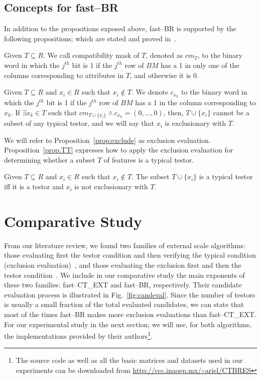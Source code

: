 \documentclass[citenumber]{llncs}
\begin{document}
%
\subsection{Concepts for fast--BR}
%
	In addition to the propositions exposed above, fast--BR is supported by the following propositions; which are stated and proved in~\cite{Lias2013}.
	
	\begin{definition}\label{def:exclusion}
		Given $T \subseteq R$. We call compatibility mask of $T$, denoted as $cm_T$, to the binary word in which the $j^{\mathit{th}}$ bit is 1 if the $j^{\mathit{th}}$ row of $BM$ has a 1 in only one of the columns corresponding to attributes in $T$, and otherwise it is 0.
	\end{definition}
	
	\begin{proposition}\label{prop:exclude} 
		Given $T \subseteq R$ and $x_i \in R$ such that $x_i \notin T$.	We denote $c_{x_k}$ to the binary word in which the $j^{\mathit{th}}$ bit is 1 if the $j^{\mathit{th}}$ row of $BM$ has a 1 in the column corresponding to $x_k$. If $\exists x_k \in T$ such that $cm_{T \cup \lbrace x_i\rbrace} \wedge c_{x_k}=(0,...,0)$, then, $T \cup \lbrace x_i\rbrace$ cannot be a subset of any typical testor, and we will say that $x_i$ is exclusionary with $T$.
	\end{proposition}
	
	We will refer to Proposition~\ref{prop:exclude} as exclusion evaluation. Proposition~\ref{prop:TT} expresses how to apply the exclusion evaluation for determining whether a subset $T$ of features is a typical testor.
	
	\begin{proposition}\label{prop:TT} 
			Given $T \subseteq R$ and $x_i \in R$ such that $x_i \notin T$. The subset $T \cup \lbrace x_i\rbrace$ is a typical testor iff it is a testor and $x_i$ is not exclusionary with $T$.
	\end{proposition}
		
%
\section{Comparative Study} \label{study}
%
	  From our literature review, we found two families of external scale algorithms: those evaluating first the testor condition and then verifying the typical condition (exclusion evaluation)~\cite{Shulcloper1982,Sanchez2007,Sanchez2010}, and those evaluating the exclusion first and then the testor condition~\cite{Santiesteban2003,Lias2009,Lias2013}. We include in our comparative study the main exponents of these two families: fast--CT\_EXT and fast--BR, respectively. Their candidate evaluation process is illustrated in Fig.~\ref{fig:candeval}.  Since the number of testors is usually a small fraction of the total evaluated candidates, we can state that most of the times fast--BR makes more exclusion evaluations than fast--CT\_EXT. For our experimental study in the next section; we will use, for both algorithms, the implementations provided by their authors\footnote{The source code as well as all the basic matrices and datasets used in our experiments can be downloaded from \url{http://ccc.inaoep.mx/~ariel/CTBRES}}.
\end{document}
